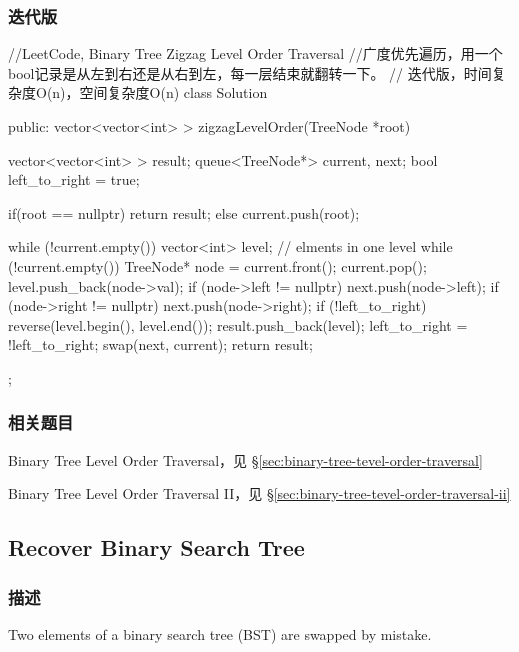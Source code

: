 \subsubsection{迭代版}
\begin{Code}
//LeetCode, Binary Tree Zigzag Level Order Traversal
//广度优先遍历，用一个bool记录是从左到右还是从右到左，每一层结束就翻转一下。
// 迭代版，时间复杂度O(n)，空间复杂度O(n)
class Solution {
public:
    vector<vector<int> > zigzagLevelOrder(TreeNode *root) {
        vector<vector<int> > result;
        queue<TreeNode*> current, next;
        bool left_to_right = true;
        
        if(root == nullptr) {
            return result;
        } else {
            current.push(root);
        }

        while (!current.empty()) {
            vector<int> level; // elments in one level
            while (!current.empty()) {
                TreeNode* node = current.front();
                current.pop();
                level.push_back(node->val);
                if (node->left != nullptr) next.push(node->left);
                if (node->right != nullptr) next.push(node->right);
            }
            if (!left_to_right) reverse(level.begin(), level.end());
            result.push_back(level);
            left_to_right = !left_to_right;
            swap(next, current);
        }
        return result;
    }
};
\end{Code}


\subsubsection{相关题目}
\begindot
\item Binary Tree Level Order Traversal，见 \S \ref{sec:binary-tree-tevel-order-traversal}
\item Binary Tree Level Order Traversal II，见 \S \ref{sec:binary-tree-tevel-order-traversal-ii}
\myenddot


\subsection{Recover Binary Search Tree}
\label{sec:recover-binary-search-tree}


\subsubsection{描述}
Two elements of a binary search tree (BST) are swapped by mistake.

